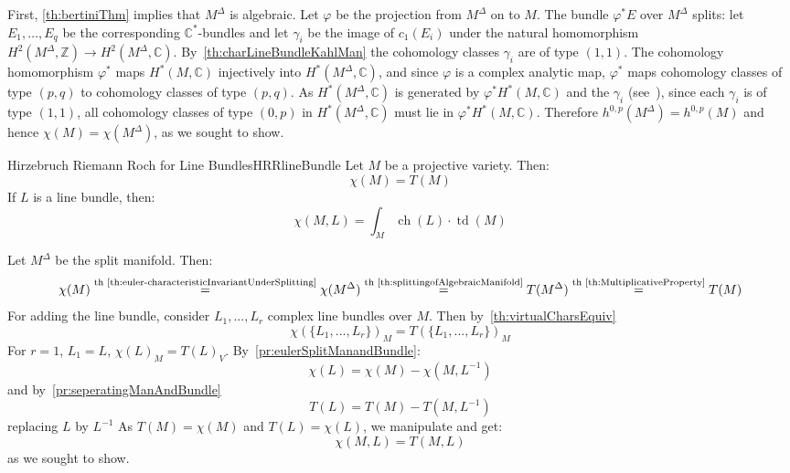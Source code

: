 \documentclass{ut-thesis}
\newenvironment{Proof}[1][]
  {\begin{ProofTcb}[#1]}
  {\end{ProofTcb}}
\renewcommand{\phi}{\varphi}
\newcommand{\ch}{{\operatorname{ch}}}
\newcommand{\td}{{\operatorname{td}}}
\renewcommand{\ch}{{\operatorname{ch}}}
\begin{document}
\begin{Proof}
  First, \cref{th:bertiniThm} implies that $M^\Delta$ is algebraic. Let $\phi$ be the projection from
  $M^\Delta$ on to $M$. The bundle $\phi^* E$ over $M^\Delta$ splits: let $E_1,\ldots,E_q$ be the
  corresponding
  $\mathbb{C}^*$-bundles and let $\gamma_i$ be the image of $c_1(E_i)$ under the natural homomorphism
  $H^2(M^\Delta,\mathbb{Z}) \to H^2(M^\Delta,\mathbb{C})$. By~\cref{th:charLineBundleKahlMan} the cohomology classes $\gamma_i$ are of type $(1,1)$. The
  cohomology homomorphism $\phi^*$ maps $H^*(M,\mathbb{C})$ injectively into $H^*(M^\Delta,\mathbb{C})$, and since $\phi$ is a complex analytic map, $\phi^*$ maps cohomology classes of type
  $(p,q)$ to cohomology classes of type $(p,q)$. As $H^*(M^\Delta,\mathbb{C})$ is generated by
  $\phi^* H^*(M,\mathbb{C})$ and the $\gamma_i$ (see~\cite{NateKTheory}), since each $\gamma_i$ is of type
  $(1,1)$, all cohomology classes of type $(0,p)$ in $H^*(M^\Delta,\mathbb{C})$ must lie in $\phi^*
  H^*(M,\mathbb{C})$. Therefore $h^{0,p}(M^\Delta) = h^{0,p}(M)$ and hence $\chi(M) = \chi(M^\Delta)$, as we
  sought to show.

\end{Proof}

\begin{thm}{Hirzebruch Riemann Roch for Line Bundles}{HRRlineBundle}
  Let $M$ be a projective variety. Then:
  \[
    \chi(M) = T(M)
  \]
  If $L$ is a line bundle, then:
  \[
    \chi(M,L) = \int_M \ch(L)\cdot \td(M)
  \]
\end{thm}

\begin{Proof}
  Let $M^\Delta$ be the split manifold. Then:
  \[
    \chi(M) \overset{\text{th~\ref{th:euler-characteristicInvariantUnderSplitting}}}{=} \chi(M^\Delta)
      \overset{\text{th~\ref{th:splittingofAlgebraicManifold}}}{=} T(M^\Delta)
      \overset{\text{th~\ref{th:MultiplicativeProperty}}}{=} T(M)
  \]
  For adding the line bundle, consider
  $L_1,..., L_r$ complex line bundles over $M$. Then by~\cref{th:virtualCharsEquiv}
  \[
    \chi(\{L_1, ..., L_r\})_M = T(\{L_1, ..., L_r\})_M
  \]
  For $r = 1$, $L_1 = L$, $\chi(L)_M = T(L)_V$. By~\cref{pr:eulerSplitManandBundle}:
  \[
  \chi(L) = \chi(M) - \chi(M,L^{-1})
\]
  and by~\cref{pr:seperatingManAndBundle}
\[
  T(L) = T(M) - T(M,L^{-1})
\]
  replacing $L$ by $L^{-1}$ As $T(M) = \chi(M)$ and $T(L) = \chi(L)$, we manipulate and get:
  \[
    \chi(M,L) = T(M,L)
  \]
as we sought to show.
\end{Proof}
\end{document}

